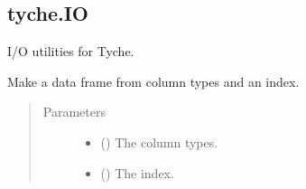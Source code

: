 \documentclass[letterpaper,10pt,english]{sphinxmanual}
\begin{document}
\subsection{tyche.IO}
\label{\detokenize{tyche:module-tyche.IO}}\label{\detokenize{tyche:tyche-io}}
I/O utilities for Tyche.

\begin{fulllineitems}
\label{\detokenize{tyche:tyche.IO.make_table}}
Make a data frame from column types and an index.
\begin{quote}\begin{description}
\item[{Parameters}] \leavevmode\begin{itemize}
\item {} 
 () \textendash{} The column types.

\item {} 
 () \textendash{} The index.

\end{itemize}

\end{description}\end{quote}

\end{fulllineitems}

\end{document}
